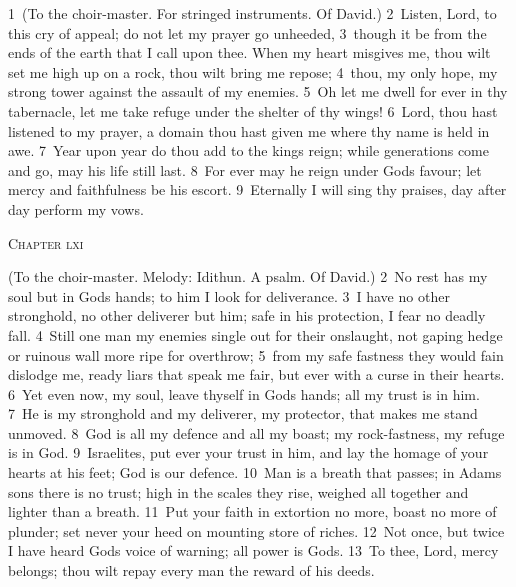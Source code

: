 \documentclass[10pt]{book} %
\begin{document}
\textcolor{benred8}{1}~(To the choir-master. For stringed instruments. Of David.)
\textcolor{benred8}{2}~Listen, Lord, to this cry of appeal; do not let my prayer go unheeded, \textcolor{benred8}{3}~though it be from the ends of the earth that I call upon thee. When my heart misgives me, thou wilt set me high up on a rock, thou wilt bring me repose; \textcolor{benred8}{4}~thou, my only hope, my strong tower against the assault of my enemies. \textcolor{benred8}{5}~Oh let me dwell for ever in thy tabernacle, let me take refuge under the shelter of thy wings! \textcolor{benred8}{6}~Lord, thou hast listened to my prayer, a domain thou hast given me where thy name is held in awe. \textcolor{benred8}{7}~Year upon year do thou add to the king\textquotesingle s reign; while generations come and go, may his life still last. \textcolor{benred8}{8}~For ever may he reign under God\textquotesingle s favour; let mercy and faithfulness be his escort. \textcolor{benred8}{9}~Eternally I will sing thy praises, day after day perform my vows.
\begin{large}\begin{center}\textsc{Chapter lxi}\end{center}\end{large}
(To the choir-master. Melody: Idithun. A psalm. Of David.)
\textcolor{benred8}{2}~No rest has my soul but in God\textquotesingle s hands; to him I look for deliverance. \textcolor{benred8}{3}~I have no other stronghold, no other deliverer but him; safe in his protection, I fear no deadly fall. \textcolor{benred8}{4}~Still one man my enemies single out for their onslaught, not gaping hedge or ruinous wall more ripe for overthrow; \textcolor{benred8}{5}~from my safe fastness they would fain dislodge me, ready liars that speak me fair, but ever with a curse in their hearts. \textcolor{benred8}{6}~Yet even now, my soul, leave thyself in God\textquotesingle s hands; all my trust is in him. \textcolor{benred8}{7}~He is my stronghold and my deliverer, my protector, that makes me stand unmoved. \textcolor{benred8}{8}~God is all my defence and all my boast; my rock-fastness, my refuge is in God. \textcolor{benred8}{9}~Israelites, put ever your trust in him, and lay the homage of your hearts at his feet; God is our defence.
\textcolor{benred8}{10}~Man is a breath that passes; in Adam\textquotesingle s sons there is no trust; high in the scales they rise, weighed all together and lighter than a breath. \textcolor{benred8}{11}~Put your faith in extortion no more, boast no more of plunder; set never your heed on mounting store of riches. \textcolor{benred8}{12}~Not once, but twice I have heard God\textquotesingle s voice of warning; all power is God\textquotesingle s. \textcolor{benred8}{13}~To thee, Lord, mercy belongs; thou wilt repay every man the reward of his deeds.
\end{document}
